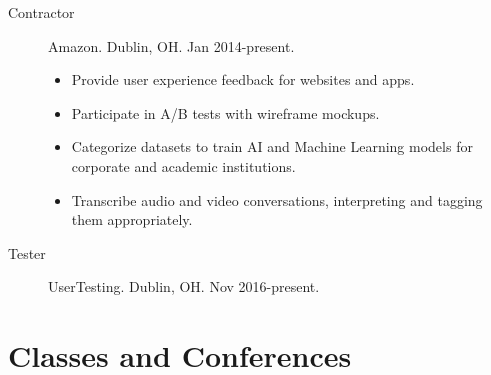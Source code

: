 \documentclass{article}
\begin{document}
\begin{description}
  \item[Contractor] Amazon. Dublin, OH. Jan 2014-present.
  \begin{itemize}
    \item Provide user experience feedback for websites and apps.
    \item Participate in A/B tests with wireframe mockups.
    \item Categorize datasets to train AI and Machine Learning models for corporate and academic institutions.
    \item Transcribe audio and video conversations, interpreting and tagging them appropriately.
  \end{itemize}
  \item[Tester] UserTesting. Dublin, OH. Nov 2016-present.
\end{description}

\section{Classes and Conferences}
\end{document}
